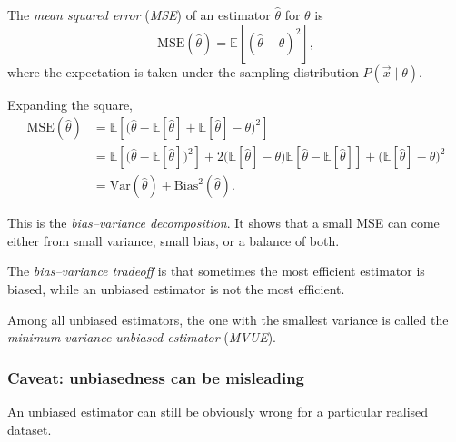 \documentclass[11pt, titlepage]{article} %
\numberwithin{equation}{section}
\theoremstyle{definition}
\numberwithin{assumption}{section}
\begin{document}
The \textit{mean squared error} (\textit{MSE}) of an estimator $\hat{\theta}$ for $\theta$ is
\begin{equation*}
    \mathrm{MSE}(\hat{\theta})=\mathbb{E}\!\left[(\hat{\theta}-\theta)^2\right],
\end{equation*}
where the expectation is taken under the sampling distribution $P(\vec x\mid \theta)$.

Expanding the square,
\begin{align*}
    \mathrm{MSE}(\hat{\theta})
    &= \mathbb{E}\!\left[\bigl(\hat{\theta}-\mathbb{E}[\hat{\theta}]+\mathbb{E}[\hat{\theta}]-\theta\bigr)^2\right]\\
    &= \mathbb{E}\!\left[\bigl(\hat{\theta}-\mathbb{E}[\hat{\theta}]\bigr)^2\right]
    +2\bigl(\mathbb{E}[\hat{\theta}]-\theta\bigr)\mathbb{E}\!\left[\hat{\theta}-\mathbb{E}[\hat{\theta}]\right]
    +\bigl(\mathbb{E}[\hat{\theta}]-\theta\bigr)^2\\
    &= \mathrm{Var}(\hat{\theta})+\mathrm{Bias}^2(\hat{\theta}).
\end{align*}

This is the \textit{bias--variance decomposition}. It shows that a small MSE can come either from small variance, small bias, or a balance of both.

The \textit{bias--variance tradeoff} is that sometimes the most efficient estimator is biased, while an unbiased estimator is not the most efficient.

Among all unbiased estimators, the one with the smallest variance is called the \textit{minimum variance unbiased estimator} (\textit{MVUE}).

\subsubsection*{Caveat: unbiasedness can be misleading}

An unbiased estimator can still be obviously wrong for a particular realised dataset.
\end{document}
